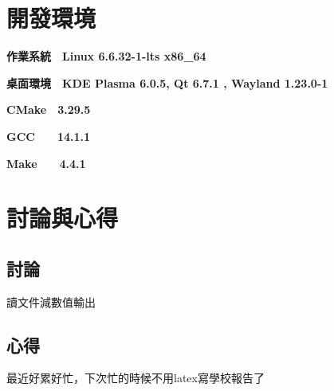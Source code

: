 \documentclass[UTF8,12pt]{article} %
\begin{document}
\section{開發環境}
\textbf{作業系統　Linux 6.6.32-1-lts x86\_64}

\textbf{桌面環境　KDE Plasma 6.0.5, Qt 6.7.1 , Wayland 1.23.0-1 }

\textbf{CMake　3.29.5 }

\textbf{GCC　　14.1.1}

\textbf{Make　　4.4.1}

\newpage

\section{討論與心得}
\subsection{討論}
讀文件減數值輸出
\subsection{心得}
最近好累好忙，下次忙的時候不用latex寫學校報告了
\end{document}
